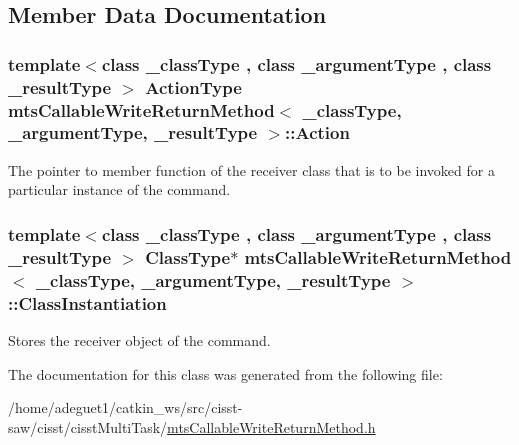 \subsection{Member Data Documentation}
\hypertarget{classmts_callable_write_return_method_a3602dcc1749010bd68b5797ea137fd44}{
\subsubsection[{Action}]{\setlength{\rightskip}{0pt plus 5cm}template$<$class \-\_\-class\-Type , class \-\_\-argument\-Type , class \-\_\-result\-Type $>$ {\bf Action\-Type} {\bf mts\-Callable\-Write\-Return\-Method}$<$ \-\_\-class\-Type, \-\_\-argument\-Type, \-\_\-result\-Type $>$\-::Action\hspace{0.3cm}{\ttfamily [protected]}}}\label{classmts_callable_write_return_method_a3602dcc1749010bd68b5797ea137fd44}
The pointer to member function of the receiver class that is to be invoked for a particular instance of the command. \hypertarget{classmts_callable_write_return_method_abf8e145001a1e02c63a7cc66ee87f066}{
\subsubsection[{Class\-Instantiation}]{\setlength{\rightskip}{0pt plus 5cm}template$<$class \-\_\-class\-Type , class \-\_\-argument\-Type , class \-\_\-result\-Type $>$ {\bf Class\-Type}$\ast$ {\bf mts\-Callable\-Write\-Return\-Method}$<$ \-\_\-class\-Type, \-\_\-argument\-Type, \-\_\-result\-Type $>$\-::Class\-Instantiation\hspace{0.3cm}{\ttfamily [protected]}}}\label{classmts_callable_write_return_method_abf8e145001a1e02c63a7cc66ee87f066}
Stores the receiver object of the command. 

The documentation for this class was generated from the following file\-:\begin{DoxyCompactItemize}
\item 
/home/adeguet1/catkin\-\_\-ws/src/cisst-\/saw/cisst/cisst\-Multi\-Task/\hyperlink{mts_callable_write_return_method_8h}{mts\-Callable\-Write\-Return\-Method.\-h}\end{DoxyCompactItemize}
